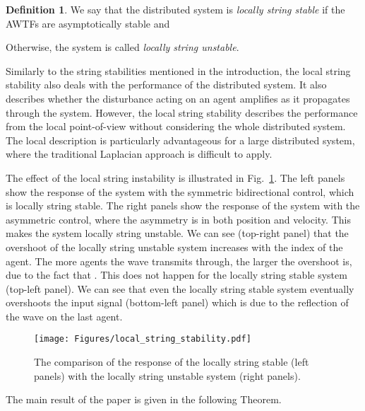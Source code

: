 \documentclass[10pt,twocolumn,twoside]{IEEEtran}
\theoremstyle{definition}
\newtheorem{defn}{Definition}
\begin{document}
\begin{defn}
  We say that the distributed system is \emph{locally string stable} if the AWTFs are asymptotically stable and
  
  Otherwise, the system is called \emph{locally string unstable}.
\end{defn}

Similarly to the string stabilities mentioned in the introduction, the local string stability also deals with the performance of the distributed system. It also describes whether the disturbance acting on an agent amplifies as it propagates through the system. However, the local string stability describes the performance from the local point-of-view without considering the whole distributed system. The local description is particularly advantageous for a large distributed system, where the traditional Laplacian approach is difficult to apply.



The effect of the local string instability is illustrated in Fig.~\ref{fig:local_string_stability}. The left panels show the response of the system with the symmetric bidirectional control, which is locally string stable. The right panels show the response of the system with the asymmetric control, where the asymmetry is in both position and velocity. This makes the system locally string unstable. We can see (top-right panel) that the overshoot of the locally string unstable system increases with the index of the agent. The more agents the wave transmits through, the larger the overshoot is, due to the fact that . This does not happen for the locally string stable system (top-left panel). We can see that even the locally string stable system eventually overshoots the input signal (bottom-left panel) which is due to the reflection of the wave on the last agent.






\begin{figure}[ht]
 \centering
  \texttt{[image: Figures/local\_string\_stability.pdf]}
  \caption{The comparison of the response of the locally string stable (left panels) with the locally string unstable system (right panels).}
  \label{fig:local_string_stability}
\end{figure}

The main result of the paper is given in the following Theorem.
\end{document}

